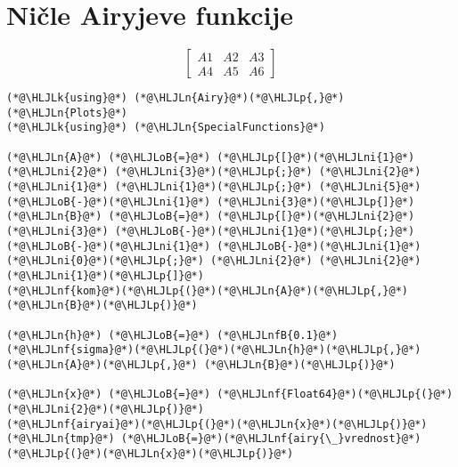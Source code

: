 \documentclass[12pt,a4paper]{article}
\newcommand{\HLJLk}[1]{\textcolor[RGB]{148,91,176}{\textbf{#1}}}
\newcommand{\HLJLn}[1]{#1}
\newcommand{\HLJLnf}[1]{\textcolor[RGB]{66,102,213}{#1}}
\newcommand{\HLJLnfB}[1]{\textcolor[RGB]{59,151,46}{#1}}
\newcommand{\HLJLni}[1]{\textcolor[RGB]{59,151,46}{#1}}
\newcommand{\HLJLoB}[1]{\textcolor[RGB]{102,102,102}{\textbf{#1}}}
\newcommand{\HLJLp}[1]{#1}
\begin{document}
\section{Ničle Airyjeve funkcije}
\[
\begin{bmatrix}A1 &A2 & A3\\A4 & A5 & A6 \end{bmatrix}
\]

\begin{lstlisting}
(*@\HLJLk{using}@*) (*@\HLJLn{Airy}@*)(*@\HLJLp{,}@*) (*@\HLJLn{Plots}@*)
(*@\HLJLk{using}@*) (*@\HLJLn{SpecialFunctions}@*)

(*@\HLJLn{A}@*) (*@\HLJLoB{=}@*) (*@\HLJLp{[}@*)(*@\HLJLni{1}@*) (*@\HLJLni{2}@*) (*@\HLJLni{3}@*)(*@\HLJLp{;}@*) (*@\HLJLni{2}@*) (*@\HLJLni{1}@*) (*@\HLJLni{1}@*)(*@\HLJLp{;}@*) (*@\HLJLni{5}@*) (*@\HLJLoB{-}@*)(*@\HLJLni{1}@*) (*@\HLJLni{3}@*)(*@\HLJLp{]}@*)
(*@\HLJLn{B}@*) (*@\HLJLoB{=}@*) (*@\HLJLp{[}@*)(*@\HLJLni{2}@*) (*@\HLJLni{3}@*) (*@\HLJLoB{-}@*)(*@\HLJLni{1}@*)(*@\HLJLp{;}@*) (*@\HLJLoB{-}@*)(*@\HLJLni{1}@*) (*@\HLJLoB{-}@*)(*@\HLJLni{1}@*) (*@\HLJLni{0}@*)(*@\HLJLp{;}@*) (*@\HLJLni{2}@*) (*@\HLJLni{2}@*) (*@\HLJLni{1}@*)(*@\HLJLp{]}@*)
(*@\HLJLnf{kom}@*)(*@\HLJLp{(}@*)(*@\HLJLn{A}@*)(*@\HLJLp{,}@*) (*@\HLJLn{B}@*)(*@\HLJLp{)}@*)

(*@\HLJLn{h}@*) (*@\HLJLoB{=}@*) (*@\HLJLnfB{0.1}@*)
(*@\HLJLnf{sigma}@*)(*@\HLJLp{(}@*)(*@\HLJLn{h}@*)(*@\HLJLp{,}@*)  (*@\HLJLn{A}@*)(*@\HLJLp{,}@*) (*@\HLJLn{B}@*)(*@\HLJLp{)}@*)

(*@\HLJLn{x}@*) (*@\HLJLoB{=}@*) (*@\HLJLnf{Float64}@*)(*@\HLJLp{(}@*)(*@\HLJLni{2}@*)(*@\HLJLp{)}@*)
(*@\HLJLnf{airyai}@*)(*@\HLJLp{(}@*)(*@\HLJLn{x}@*)(*@\HLJLp{)}@*)
(*@\HLJLn{tmp}@*) (*@\HLJLoB{=}@*)(*@\HLJLnf{airy{\_}vrednost}@*)(*@\HLJLp{(}@*)(*@\HLJLn{x}@*)(*@\HLJLp{)}@*)
\end{lstlisting}
\end{document}
